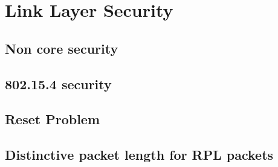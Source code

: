 \chapter{Link Layer Security}

\section{Non core security}

\section{802.15.4 security}

\section{Reset Problem}

\section{Distinctive packet length for RPL packets}
